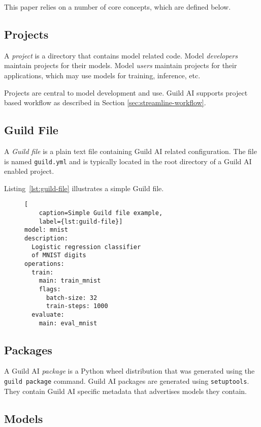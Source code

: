\documentclass{article}
\begin{document}
This paper relies on a number of core concepts, which are defined
below.

\subsection{Projects}

A \emph{project} is a directory that contains model related
code. Model \emph{developers} maintain projects for their
models. Model \emph{users} maintain projects for their applications,
which may use models for training, inference, etc.

Projects are central to model development and use. Guild AI supports
project based workflow as described in Section
\ref{sec:streamline-workflow}.

\subsection{Guild File}

A \emph{Guild file} is a plain text file containing Guild AI related
configuration. The file is named \verb|guild.yml| and is typically
located in the root directory of a Guild AI enabled project.

Listing~\ref{lst:guild-file} illustrates a simple Guild file.

\begin{figure}
\begin{lstlisting}[
    caption=Simple Guild file example,
    label={lst:guild-file}]
model: mnist
description:
  Logistic regression classifier
  of MNIST digits
operations:
  train:
    main: train_mnist
    flags:
      batch-size: 32
      train-steps: 1000
  evaluate:
    main: eval_mnist
\end{lstlisting}
\end{figure}

\subsection{Packages}

A Guild AI \emph{package} is a Python wheel distribution \cite{wheels}
that was generated using the \verb|guild package| command. Guild AI
packages are generated using \verb|setuptools|. They contain Guild AI
specific metadata that advertises models they contain.

\subsection{Models}
\end{document}
